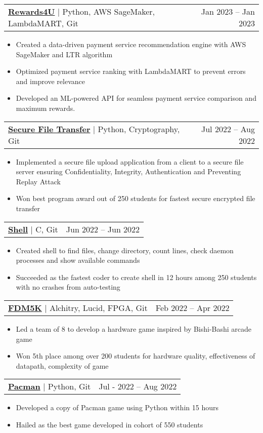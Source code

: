 \documentclass[letterpaper,11pt]{article}
\makeatletter
\newcommand{\resumeItem}[1]{
  \item\small{
    {#1 \vspace{-2.5pt}}
  }
}
\newcommand{\resumeProjectHeading}[2]{
    \item
    \begin{tabular*}{0.97\textwidth}{l@{\extracolsep{\fill}}r}
      \small#1 & \footnotesize#2 \\
    \end{tabular*}\vspace{-7pt}
}
\newcommand{\resumeItemListStart}{\begin{itemize}}
\newcommand{\resumeItemListEnd}{\end{itemize}\vspace{-5pt}}
\makeatother
\begin{document}
          \resumeProjectHeading
          {\textbf{{\href{https://github.com/Usgupta/Rewards4You}{\faExternalLink* Rewards4U}}} $|$ {Python, AWS SageMaker, LambdaMART, Git}}{Jan 2023 -- Jan 2023}
          \resumeItemListStart
            \resumeItem{Created a data-driven payment service recommendation engine with AWS SageMaker and LTR algorithm}
            \resumeItem{Optimized payment service ranking with LambdaMART to prevent errors and improve relevance}
            \resumeItem{Developed an ML-powered API for seamless payment service comparison and maximum rewards.}
        
          \resumeItemListEnd

        \resumeProjectHeading
          {\textbf{{\href{https://github.com/Usgupta/pa_2}{\faExternalLink* Secure File Transfer}}} $|$ {Python, Cryptography, Git}}{Jul 2022 -- Aug 2022}
          \resumeItemListStart
          
            \resumeItem{Implemented a secure file upload application from a client to a secure file server ensuring Confidentiality, Integrity, Authentication and Preventing Replay Attack}
            \resumeItem{Won best program award out of 250 students for fastest secure encrypted file transfer}
           
          \resumeItemListEnd

         \resumeProjectHeading
          {\textbf{{\href{https://github.com/Usgupta/shell}{\faExternalLink* Shell}}} $|$ {C, Git}}	{Jun 2022 -- Jun 2022}
          \resumeItemListStart
            \resumeItem{Created shell to find files, change directory, count lines, check daemon processes and show available commands}
            \resumeItem{Succeeded as the fastest coder to create shell in 12 hours among 250 students with no crashes from auto-testing}
          \resumeItemListEnd
          
        \resumeProjectHeading
          {\textbf{{\href{https://github.com/Usgupta/50.002-Computation-Structures-1D-Project}{\faExternalLink* FDM5K}}} $|$ {Alchitry, Lucid, FPGA, Git}}{\footnotesize	{Feb 2022 -- Apr 2022}}
          \resumeItemListStart
            \resumeItem{Led a team of 8 to develop a hardware game inspired by Bishi-Bashi arcade game}
            \resumeItem{Won 5th place among over 200 students for hardware quality, effectiveness of datapath, complexity of game}
          \resumeItemListEnd

           \resumeProjectHeading
            {\textbf{{\href{https://github.com/Usgupta/Pacman-The-Game}{\faExternalLink* Pacman}}} $|$ {Python, Git}}{\footnotesize	{Jul - 2022 -- Aug 2022}}
          \resumeItemListStart
            \resumeItem{Developed a copy of Pacman game using Python within 15 hours}
            \resumeItem{Hailed as the best game developed in cohort of 550 students}
          \resumeItemListEnd
          
\end{document}
